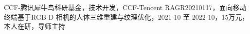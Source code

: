 \program





\noindent[1] CCF-腾讯犀牛鸟科研基金，技术开发，CCF-Tencent RAGR20210117，面向移动终端基于RGB-D 相机的人体三维重建与纹理优化，2021-10 至 2022-10，15万元，本人在研，导师主持